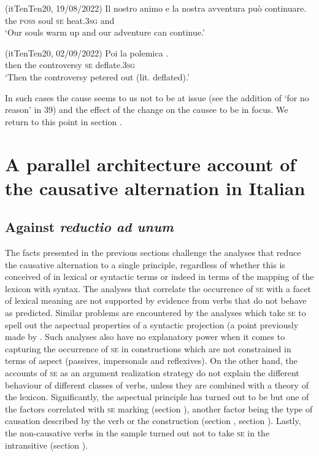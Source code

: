 \documentclass[output=paper,colorlinks,citecolor=brown
]{langscibook}
\begin{document}
\hspace*{\fill}(itTenTen20, 19/08/2022)\quad
\ea \label{bentley_example_41}
    \gll Il		nostro	animo			 e  {la nostra avventura può continuare. } \\
    	the	\textsc{poss}			soul		\textsc{se}		heat.3\textsc{sg}	and			{} \\
    \glt 					‘Our souls warm up and our adventure can continue.’
\z

\hspace*{\fill}(itTenTen20, 02/09/2022)\quad
\ea \label{bentley_example_42}
    \gll Poi 	la		polemica						. \\
    			then	the	controversy	\textsc{se}		deflate.3\textsc{sg}	 \\
    \glt ‘Then the controversy petered out (lit. deflated).’
\z


In such cases the cause seems to us not to be at issue (see the addition of ‘for no reason’ in 39) and the effect of the change on the causee to be in focus. We return to this point in section .

\section{A parallel architecture account of the causative alternation in Italian}
\label{bentley_section_5}

\subsection{Against \textit{reductio ad unum}}
\label{bentley_section_5.1}

The facts presented in the previous sections challenge the analyses that reduce the causative alternation to a single principle, regardless of whether this is conceived of in lexical or syntactic terms or indeed in terms of the mapping of the lexicon with syntax. The analyses that correlate the occurrence of \textsc{se} with a facet of lexical meaning are not supported by evidence from verbs that do not behave as predicted. Similar problems are encountered by the analyses which take \textsc{se} to spell out the aspectual properties of a syntactic projection (a point previously made by \cite[82—88]{alexiadou2015external}. Such analyses also have no explanatory power when it comes to capturing the occurrence of \textsc{se} in constructions which are not constrained in terms of aspect (passives, impersonals and reflexives). On the other hand, the accounts of \textsc{se} as an argument realization strategy do not explain the different behaviour of different classes of verbs, unless they are combined with a theory of the lexicon. Significantly, the aspectual principle has turned out to be but one of the factors correlated with \textsc{se} marking (section ), another factor being the type of causation described by the verb or the construction (section , section ). Lastly, the non-causative verbs in the sample turned out not to take \textsc{se} in the intransitive (section ). 
\end{document}

